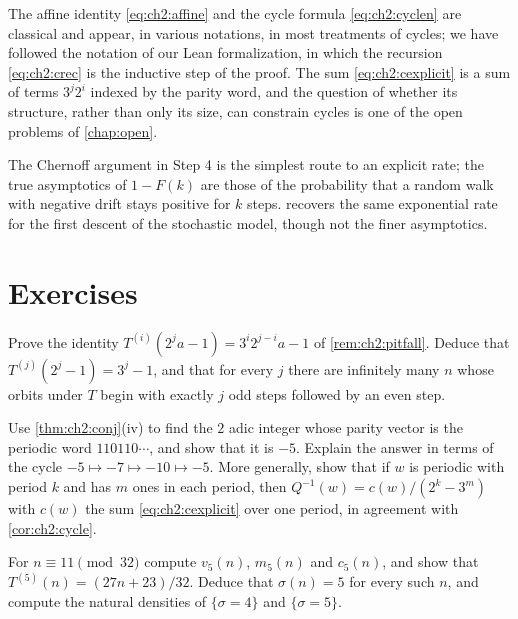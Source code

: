 The affine identity \eqref{eq:ch2:affine} and the cycle formula
\eqref{eq:ch2:cyclen} are classical and appear, in various notations, in most
treatments of cycles; we have followed the notation of our Lean formalization,
in which the recursion \eqref{eq:ch2:crec} is the inductive step of the proof.
The sum \eqref{eq:ch2:cexplicit} is a sum of terms $3^j2^i$ indexed by the
parity word, and the question of whether its structure, rather than only its
size, can constrain cycles is one of the open problems of \cref{chap:open}.

The Chernoff argument in Step 4 is the simplest route to an explicit rate; the
true asymptotics of $1-F(k)$ are those of the probability that a random walk with negative drift stays positive for $k$ steps.
 recovers the same
exponential rate for the first descent of the stochastic model, though not the
finer asymptotics.

\section*{Exercises}

\begin{exercise}\label{ex:ch2:runs}
Prove the identity $T^{(i)}(2^ja-1)=3^i2^{j-i}a-1$ of \cref{rem:ch2:pitfall}.
Deduce that $T^{(j)}(2^j-1)=3^j-1$, and that for every $j$ there are infinitely
many $n$ whose orbits under $T$ begin with exactly $j$ odd steps followed by an
even step.
\end{exercise}

\begin{exercise}\label{ex:ch2:bernstein}
Use \cref{thm:ch2:conj}(iv) to find the $2$ adic integer whose parity vector
is the periodic word $110110\cdots$, and show that it is $-5$. Explain the answer in terms of the cycle
$-5\mapsto-7\mapsto-10\mapsto-5$. More generally, show that if $w$ is periodic
with period $k$ and has $m$ ones in each period, then $Q^{-1}(w)=c(w)/(2^k-3^m)$
with $c(w)$ the sum \eqref{eq:ch2:cexplicit} over one period, in agreement with
\cref{cor:ch2:cycle}.
\end{exercise}

\begin{exercise}\label{ex:ch2:class11}
For $n\equiv11\pmod{32}$ compute $v_5(n)$, $m_5(n)$ and $c_5(n)$, and show that
$T^{(5)}(n)=(27n+23)/32$. Deduce that $\sigma(n)=5$ for every such $n$, and
compute the natural densities of $\{\sigma=4\}$ and $\{\sigma=5\}$.
\end{exercise}

